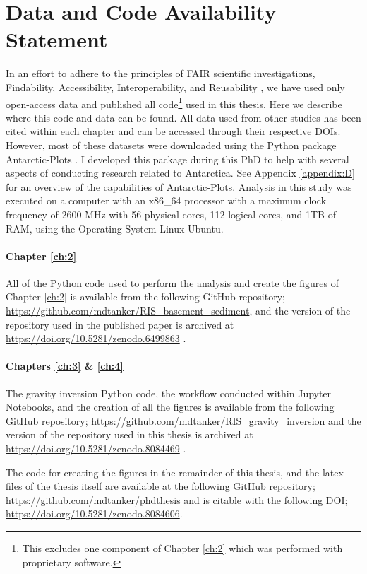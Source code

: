 \section[Data and Code]{Data and Code Availability Statement} \label{chp1_open_source}

In an effort to adhere to the principles of FAIR scientific investigations, Findability, Accessibility, Interoperability, and Reusability \citep{wilkinsonfair2016}, we have used only open-access data and published all code\footnote{This excludes one component of Chapter \ref{ch:2} which was performed with proprietary software.} used in this thesis. Here we describe where this code and data can be found. All data used from other studies has been cited within each chapter and can be accessed through their respective DOIs. However, most of these datasets were downloaded using the Python package Antarctic-Plots \citep{tankersleyantarctic2023}. I developed this package during this PhD to help with several aspects of conducting research related to Antarctica. See Appendix \ref{appendix:D} for an overview of the capabilities of Antarctic-Plots. Analysis in this study was executed on a computer with an x86\_64 processor with a maximum clock frequency of 2600 MHz with 56 physical cores, 112 logical cores, and 1TB of RAM, using the Operating System Linux-Ubuntu. 

\paragraph*{Chapter \ref{ch:2}}
All of the Python code used to perform the analysis and create the figures of Chapter \ref{ch:2} is available from the following GitHub repository; \url{https://github.com/mdtanker/RIS_basement_sediment}, and the version of the repository used in the published paper is archived at \url{https://doi.org/10.5281/zenodo.6499863} \citep{tankersleymdtanker2022}.

\paragraph*{Chapters \ref{ch:3} \& \ref{ch:4}}
The gravity inversion Python code, the workflow conducted within Jupyter Notebooks, and the creation of all the figures is available from the following GitHub repository; \url{https://github.com/mdtanker/RIS_gravity_inversion} and the version of the repository used in this thesis is archived at \url{https://doi.org/10.5281/zenodo.8084469} \citep{tankersleymdtanker2023}. 

The code for creating the figures in the remainder of this thesis, and the latex files of the thesis itself are available at the following GitHub repository; \url{https://github.com/mdtanker/phdthesis} and is citable with the following DOI; \url{https://doi.org/10.5281/zenodo.8084606}.